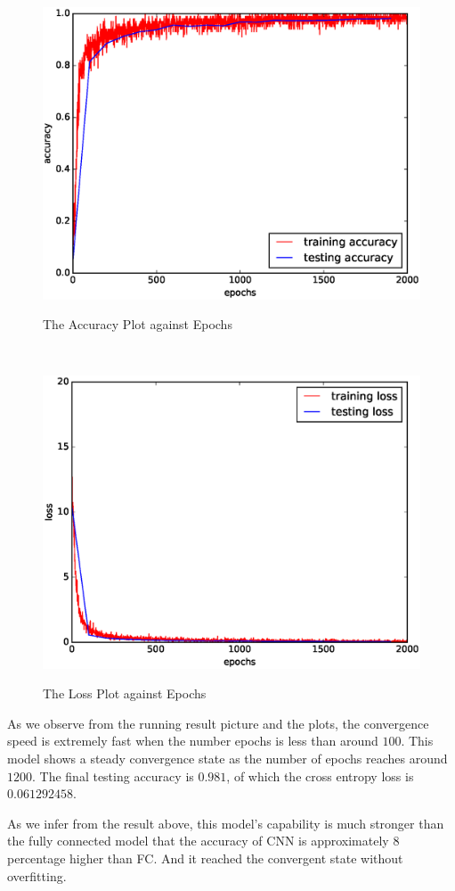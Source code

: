 \documentclass[10pt]{article}
\begin{document}
\begin{figure}[H]
\centering
\begin{minipage}[b]{0.45\textwidth}
\centering
\includegraphics[scale=.37]{plot1.eps}
\label{fig5}
\caption{The Accuracy Plot against Epochs}
\end{minipage}
\
\begin{minipage}[b]{0.45\textwidth}
\centering
\includegraphics[scale=.37]{plot2.eps}
\label{fig6}
\caption{The Loss Plot against Epochs}
\end{minipage}
\end{figure}
As we observe from the running result picture and the plots, the convergence speed is extremely fast when the number epochs is less than around $100$. This model shows a steady convergence state as the number of epochs reaches around $1200$. The final testing accuracy is $0.981$, of which the cross entropy loss is $0.061292458$.\par
As we infer from the result above, this model's capability is much stronger than the fully connected model that the accuracy of CNN is approximately $8$ percentage higher than FC. And it reached the convergent state without overfitting.
\end{document}
